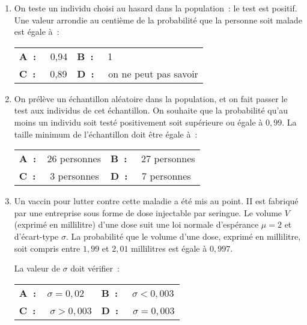 \begin{enumerate}
     \item On teste un individu choisi au hasard dans la population~: le test est positif. Une valeur arrondie au centième de la probabilité que la personne soit malade est égale à~:
     \medbreak
     \begin{tabularx}{\linewidth}{*{2}{X}}%
          \textbf{A~:~~} 0,94 &\textbf{B~:~~} 1 \\
          \textbf{C~:~~} 0,89 &\textbf{D~:~~} on ne peut pas savoir
     \end{tabularx}
     \medbreak
     \item  On prélève un échantillon aléatoire dans la population, et on fait passer le test aux individus de cet échantillon. On souhaite que la probabilité qu'au moins un individu soit testé positivement soit supérieure ou égale à $0,99$. La taille minimum de l'échantillon doit être égale à~:
     \medbreak
     \begin{tabularx}{\linewidth}{*{2}{X}}%
          \textbf{A~:~~}26 personnes &\textbf{B~:~~} 27 personnes \\
          \textbf{C~:~~} 3 personnes &\textbf{D~:~~} 7 personnes
     \end{tabularx}
     \medbreak
     \item  Un vaccin pour lutter contre cette maladie a été mis au point. II est fabriqué par une entreprise sous forme de dose injectable par seringue. Le volume $V$ (exprimé en millilitre) d'une dose suit une loi normale d'espérance $\mu = 2$ et d'écart-type $\sigma$. La probabilité que le volume d'une dose, exprimé en millilitre, soit compris entre $1,99$ et $2,01$ millilitres est égale à $0,997$.
     \par
     La valeur de $\sigma$ doit vérifier~:
     \medbreak
     \begin{tabularx}{\linewidth}{*{2}{X}}%
          \textbf{A~:~~}$\sigma = 0,02$ &\textbf{B~:~~} $\sigma < 0,003$ \\
          \textbf{C~:~~} $\sigma > 0,003$ &\textbf{D~:~~} $\sigma = 0,003$
     \end{tabularx}
     \medbreak
\end{enumerate}
\bigbreak
{}
\medbreak
